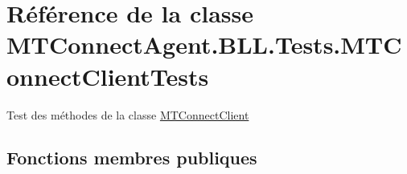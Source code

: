 \hypertarget{class_m_t_connect_agent_1_1_b_l_l_1_1_tests_1_1_m_t_connect_client_tests}{}\section{Référence de la classe M\+T\+Connect\+Agent.\+B\+L\+L.\+Tests.\+M\+T\+Connect\+Client\+Tests}
\label{class_m_t_connect_agent_1_1_b_l_l_1_1_tests_1_1_m_t_connect_client_tests}


Test des méthodes de la classe \mbox{\hyperlink{class_m_t_connect_agent_1_1_b_l_l_1_1_m_t_connect_client}{M\+T\+Connect\+Client}}  


\subsection*{Fonctions membres publiques}
